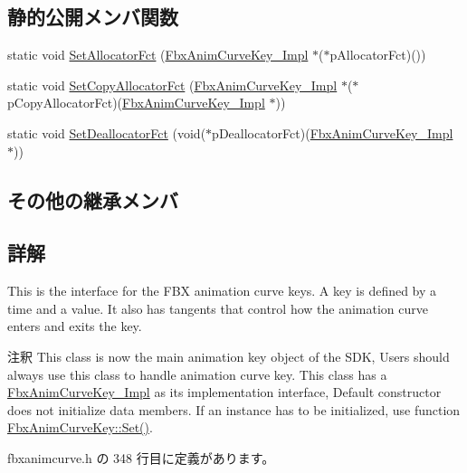 \subsection*{静的公開メンバ関数}
\begin{DoxyCompactItemize}
\item 
static void \hyperlink{class_fbx_anim_curve_key_afa4c2dc0dd61a5f1bf28a1463b3ac859}{Set\+Allocator\+Fct} (\hyperlink{class_fbx_anim_curve_key___impl}{Fbx\+Anim\+Curve\+Key\+\_\+\+Impl} $\ast$($\ast$p\+Allocator\+Fct)())
\item 
static void \hyperlink{class_fbx_anim_curve_key_a39c27002f753b9f743c5883b0c0f6278}{Set\+Copy\+Allocator\+Fct} (\hyperlink{class_fbx_anim_curve_key___impl}{Fbx\+Anim\+Curve\+Key\+\_\+\+Impl} $\ast$($\ast$p\+Copy\+Allocator\+Fct)(\hyperlink{class_fbx_anim_curve_key___impl}{Fbx\+Anim\+Curve\+Key\+\_\+\+Impl} $\ast$))
\item 
static void \hyperlink{class_fbx_anim_curve_key_a340a84d3e66d6e679232954850414f9c}{Set\+Deallocator\+Fct} (void($\ast$p\+Deallocator\+Fct)(\hyperlink{class_fbx_anim_curve_key___impl}{Fbx\+Anim\+Curve\+Key\+\_\+\+Impl} $\ast$))
\end{DoxyCompactItemize}
\subsection*{その他の継承メンバ}


\subsection{詳解}
This is the interface for the F\+BX animation curve keys. A key is defined by a time and a value. It also has tangents that control how the animation curve enters and exits the key.

\begin{DoxyRemark}{注釈}
This class is now the main animation key object of the S\+DK, Users should always use this class to handle animation curve key. This class has a \hyperlink{class_fbx_anim_curve_key___impl}{Fbx\+Anim\+Curve\+Key\+\_\+\+Impl} as its implementation interface, Default constructor does not initialize data members. If an instance has to be initialized, use function \hyperlink{class_fbx_anim_curve_key_afdab5f0d38bedc7c4715aaa6a51d4370}{Fbx\+Anim\+Curve\+Key\+::\+Set()}. 
\end{DoxyRemark}


 fbxanimcurve.\+h の 348 行目に定義があります。



